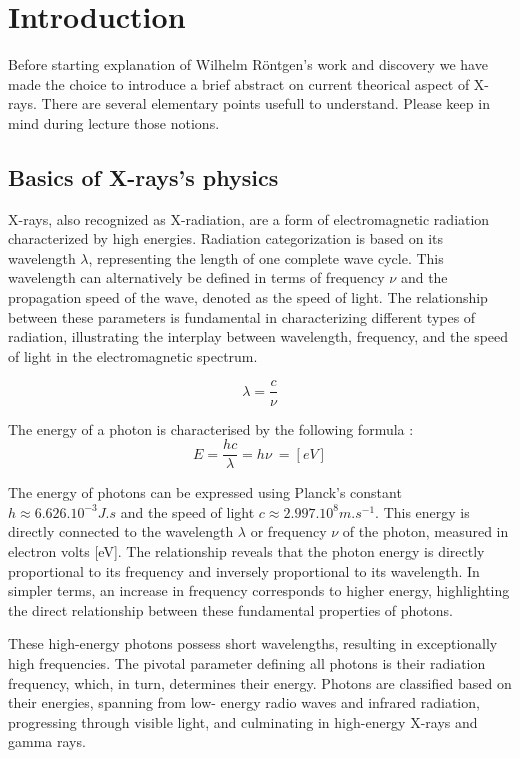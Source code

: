 \documentclass[a4paper,12pt]{report}
\begin{document}
\setlength{\parskip}{10pt}


\newpage
\section*{Introduction}

Before starting explanation of Wilhelm Röntgen's work and discovery we have made the choice to introduce a brief abstract on current theorical aspect of X-rays. There are several elementary points usefull to understand. Please keep in mind during lecture those notions.


\subsection*{Basics of X-rays's physics}
X-rays, also recognized as X-radiation, are a form of electromagnetic radiation characterized by
high energies. Radiation categorization is based on its wavelength \(\lambda\), representing the length of
one complete wave cycle. This wavelength can alternatively be defined in terms of frequency \(\nu\)
and the propagation speed of the wave, denoted as the speed of light. The relationship
between these parameters is fundamental in characterizing different types of radiation, illustrating
the interplay between wavelength, frequency, and the speed of light in the electromagnetic
spectrum.

\begin{equation}
  \lambda = \frac{c}{\nu}
\end{equation}


The energy of a photon is characterised by the following formula :
\begin{equation}
E= \frac{hc}{\lambda}= h\nu\ = [eV]
\end{equation}


The energy of photons can be expressed using Planck's constant \(h \approx 6.626.10^{-3} J.s\) and the
speed of light \(c \approx 2.997.10^8 m.s^{-1}\). This energy is directly connected to the wavelength \(\lambda\) or
frequency \(\nu\) of the photon, measured in electron volts [eV]. The relationship reveals that the
photon energy is directly proportional to its frequency and inversely proportional to its
wavelength. In simpler terms, an increase in frequency corresponds to higher energy, highlighting
the direct relationship between these fundamental properties of photons.

These high-energy photons possess short wavelengths, resulting in exceptionally high
frequencies. The pivotal parameter defining all photons is their radiation frequency, which, in
turn, determines their energy. Photons are classified based on their energies, spanning from low-
energy radio waves and infrared radiation, progressing through visible light, and culminating in
high-energy X-rays and gamma rays.
\newpage
\end{document}
